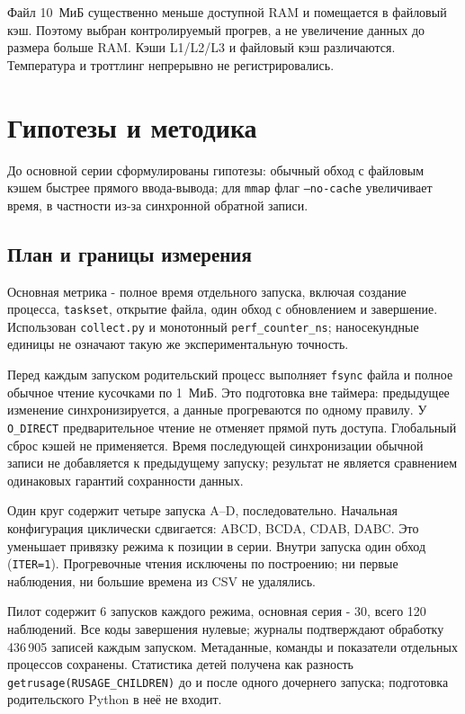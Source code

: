 Файл 10~МиБ существенно меньше доступной RAM и помещается в файловый
кэш. Поэтому выбран контролируемый прогрев, а не увеличение данных
до размера больше RAM. Кэши L1/L2/L3 и файловый кэш различаются.
Температура и троттлинг непрерывно не регистрировались.

\section{Гипотезы и методика}
До основной серии сформулированы гипотезы:
обычный обход с файловым кэшем быстрее прямого ввода-вывода;
для \texttt{mmap} флаг \texttt{--no-cache} увеличивает время,
в частности из-за синхронной обратной записи. 

\subsection{План и границы измерения}
Основная метрика - полное время отдельного запуска, включая создание
процесса, \texttt{taskset}, открытие файла, один обход с обновлением
и завершение. Использован \texttt{collect.py} и монотонный
\texttt{perf\_counter\_ns}; наносекундные единицы не означают такую же
экспериментальную точность.

Перед каждым запуском родительский процесс выполняет
\texttt{fsync} файла и полное обычное чтение кусочками по 1~МиБ.
Это подготовка вне таймера: предыдущее изменение синхронизируется,
а данные прогреваются по одному правилу. У \texttt{O\_DIRECT}
предварительное чтение не отменяет прямой путь доступа. Глобальный
сброс кэшей не применяется. Время последующей синхронизации обычной
записи не добавляется к предыдущему запуску; результат не является
сравнением одинаковых гарантий сохранности данных.

Один круг содержит четыре запуска A--D, последовательно.
Начальная конфигурация циклически сдвигается:
ABCD, BCDA, CDAB, DABC. Это уменьшает привязку режима к позиции
в серии. Внутри запуска один обход (\texttt{ITER=1}).
Прогревочные чтения исключены по построению; ни первые наблюдения,
ни большие времена из CSV не удалялись.

Пилот содержит 6 запусков каждого режима, основная серия - 30,
всего 120 наблюдений. Все коды завершения нулевые; журналы подтверждают
обработку 436\,905 записей каждым запуском. Метаданные, команды и
показатели отдельных процессов сохранены. Статистика детей получена
как разность \texttt{getrusage(RUSAGE\_CHILDREN)} до и после одного
дочернего запуска; подготовка родительского Python в неё не входит.

